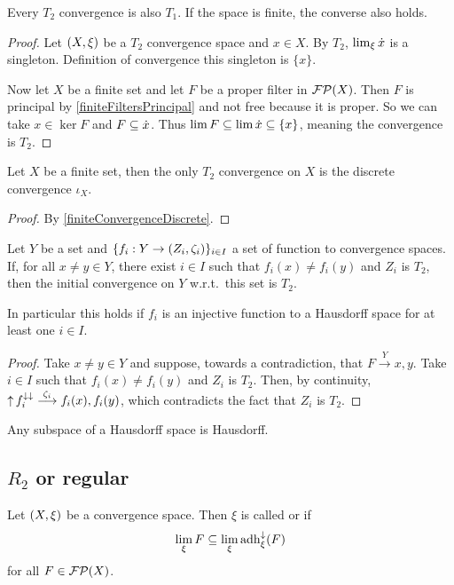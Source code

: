 \begin{proposition}
Every $T_2$ convergence is also $T_1$. If the space is finite, the converse also holds.
\end{proposition}
\begin{proof}
Let $\sSet{X, \xi}$ be a $T_2$ convergence space and $x\in X$. By $T_2$, $\lim_\xi\dot{x}$ is a singleton. Definition of convergence this singleton is $\{x\}$.

Now let $X$ be a finite set and let $F$ be a proper filter in $\operatorname{\mathcal{FP}}(X)$. Then $F$ is principal by \ref{finiteFiltersPrincipal} and not free because it is proper. So we can take $x\in \ker F$ and $F \subseteq \dot{x}$. Thus $\lim F \subseteq \lim \dot{x} \subseteq \{x\}$, meaning the convergence is $T_2$.
\end{proof}
\begin{corollary}
Let $X$ be a finite set, then the only $T_2$ convergence on $X$ is the discrete convergence $\iota_X$.
\end{corollary}
\begin{proof}
By \ref{finiteConvergenceDiscrete}.
\end{proof}

\begin{lemma} \label{T2initialConvergence}
Let $Y$ be a set and $\{f_i: Y\to \sSet{Z_i, \zeta_i}\}_{i\in I}$ a set of function to convergence spaces. If, for all $x \neq y\in Y$, there exist $i\in I$ such that $f_i(x) \neq f_i(y)$ and $Z_i$ is $T_2$, then the initial convergence on $Y$ w.r.t.\ this set is $T_2$.
\end{lemma}
In particular this holds if $f_i$ is an injective function to a Hausdorff space for at least one $i\in I$.
\begin{proof}
Take $x\neq y\in Y$ and suppose, towards a contradiction, that $F\overset{Y}{\longrightarrow} x,y$. Take $i\in I$ such that $f_i(x) \neq f_i(y)$ and $Z_i$ is $T_2$. Then, by continuity, $\operatorname{\uparrow} f_i^{\downarrow\downarrow} \overset{\zeta_i}{\longrightarrow} f_i(x), f_i(y)$, which contradicts the fact that $Z_i$ is $T_2$.
\end{proof}
\begin{corollary} \label{HausdorffSubspace}
Any subspace of a Hausdorff space is Hausdorff.
\end{corollary}


\subsection{$R_2$ or regular}
\begin{definition}
Let $\sSet{X,\xi}$ be a convergence space. Then $\xi$ is called  or  if
\[ \lim_\xi F \subseteq \lim_\xi \operatorname{adh}_\xi^\downarrow(F) \]
for all $F\in \operatorname{\mathcal{FP}}(X)$.
\end{definition}

